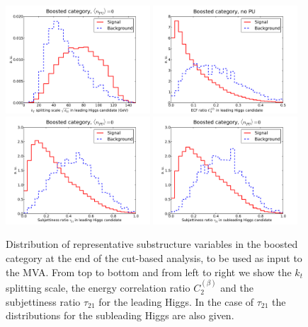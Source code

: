 \begin{figure}[t]
  \begin{center}
    \includegraphics[width=0.48\textwidth]{plots/split12_h1_C1_boost.pdf} 
  \includegraphics[width=0.48\textwidth]{plots/EEC_C2_h0_C1_boost.pdf}
  \includegraphics[width=0.48\textwidth]{plots/tau21_h0_C1_boost.pdf}
  \includegraphics[width=0.48\textwidth]{plots/tau21_h1_C1_boost.pdf}
  \caption{\small Distribution of representative substructure variables
    in the boosted category at the end of the cut-based
    analysis, to be used as input to the MVA.
    From top to bottom and from left to right we show  the
    $k_t$ splitting scale, the energy correlation ratio $C_2^{(\beta)}$
    and the  subjettiness ratio $\tau_{21}$ for the leading
    Higgs.
    In the case of 
    $\tau_{21}$  the distributions for the subleading Higgs are also given.
 }
\label{fig:mva_substructure_1}
\end{center}
\end{figure}


